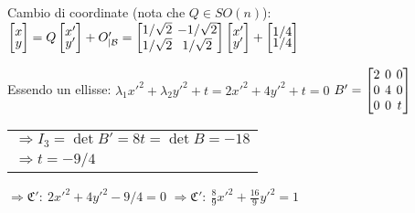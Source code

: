 Cambio di coordinate (nota che $Q \in SO(n)$):
$
\begin{bmatrix}
	x \\[-0.3em]
	y \\
\end{bmatrix}
= Q
\begin{bmatrix}
	x' \\[-0.3em]
	y' \\
\end{bmatrix}
+ O'_{|\Base} = 
\left[
	\arraycolsep=2.0pt\def\arraystretch{1.0}
	\begin{array}{@{}cc@{}}
		1/\sqrt{2} & -1/\sqrt{2} \\
		1/\sqrt{2} & 1/\sqrt{2}
	\end{array}
\right]
\begin{bmatrix}
	x' \\[-0.3em]
	y' \\
\end{bmatrix}
+
\begin{bmatrix}
	1/4 \\[-0.3em]
	1/4 \\
\end{bmatrix}
$

Essendo un ellisse: $\lambda_1x'^2 + \lambda_2y'^2 + t = 2x'^2 + 4y'^2 + t = 0$
$
B' = \left[
	\arraycolsep=2.0pt\def\arraystretch{1.0}
	\begin{array}{@{}ccc@{}}
		2 & 0 & 0 \\
		0 & 4 & 0 \\
		0 & 0 & t \\
	\end{array}
\right]
$
\begin{tabular}{l}
	$\Rightarrow I_3 = \det B' = 8t = \det B = -18$ \\
	$\Rightarrow t = -9/4$
\end{tabular}
$\Rightarrow \mathfrak{C'}:\ 2x'^2 + 4y'^2 -9/4 = 0$
$\Rightarrow \mathfrak{C'}:\ \frac{8}{9}x'^2 + \frac{16}{9}y'^2 = 1$
